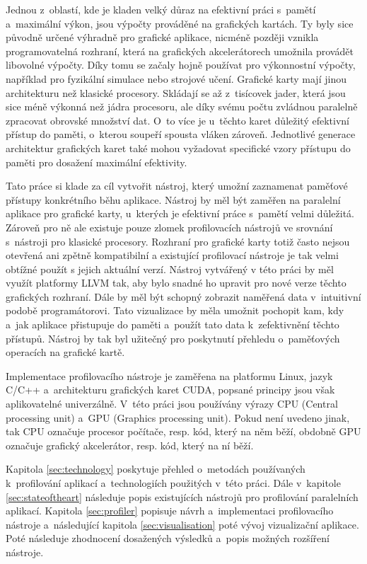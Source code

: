 Jednou z~oblastí, kde je kladen velký důraz na efektivní práci s~pamětí a~maximální výkon, jsou výpočty prováděné na grafických kartách. Ty byly sice původně určené výhradně pro grafické aplikace, nicméně později vznikla programovatelná rozhraní, která na grafických akcelerátorech umožnila provádět libovolné výpočty. Díky tomu se začaly hojně používat pro výkonnostní výpočty, například pro fyzikální simulace nebo strojové učení. Grafické karty mají jinou architekturu než klasické procesory. Skládají se až z~tisícovek jader, která jsou sice méně výkonná než jádra procesoru, ale díky svému počtu zvládnou paralelně zpracovat obrovské množství dat. O~to více je u~těchto karet důležitý efektivní přístup do paměti, o~kterou soupeří spousta vláken zároveň. Jednotlivé generace architektur grafických karet také mohou vyžadovat specifické vzory přístupu do paměti pro dosažení maximální efektivity.

Tato práce si klade za cíl vytvořit nástroj, který umožní zaznamenat paměťové přístupy konkrétního běhu aplikace. Nástroj by měl být zaměřen na paralelní aplikace pro grafické karty, u~kterých je efektivní práce s~pamětí velmi důležitá. Zároveň pro ně ale existuje pouze zlomek profilovacích nástrojů ve srovnání s~nástroji pro klasické procesory. Rozhraní pro grafické karty totiž často nejsou otevřená ani zpětně kompatibilní a existující profilovací nástroje je tak velmi obtížné použít s jejich aktuální verzí. Nástroj vytvářený v této práci by měl využít platformy LLVM tak, aby bylo snadné ho upravit pro nové verze těchto grafických rozhraní. Dále by měl být schopný zobrazit naměřená data v~intuitivní podobě programátorovi. Tato vizualizace by měla umožnit pochopit kam, kdy a~jak aplikace přistupuje do paměti a~použít tato data k~zefektivnění těchto přístupů. Nástroj by tak byl užitečný pro poskytnutí přehledu o~paměťových operacích na grafické kartě.

Implementace profilovacího nástroje je zaměřena na platformu Linux, jazyk C/C++ a~architekturu grafických karet CUDA, popsané principy jsou však aplikovatelné univerzálně. V~této práci jsou používány výrazy CPU (Central processing unit) a~GPU (Graphics processing unit). Pokud není uvedeno jinak, tak CPU označuje procesor počítače, resp. kód, který na něm běží, obdobně GPU označuje grafický akcelerátor, resp. kód, který na ní běží.

Kapitola \ref{sec:technology} poskytuje přehled o~metodách používaných k~profilování aplikací a~technologiích použitých v~této práci. Dále v~kapitole \ref{sec:stateoftheart} následuje popis existujících nástrojů pro profilování paralelních aplikací. Kapitola \ref{sec:profiler} popisuje návrh a~implementaci profilovacího nástroje a~následující kapitola \ref{sec:visualisation} poté vývoj vizualizační aplikace. Poté následuje zhodnocení dosažených výsledků a~popis možných rozšíření nástroje. 
